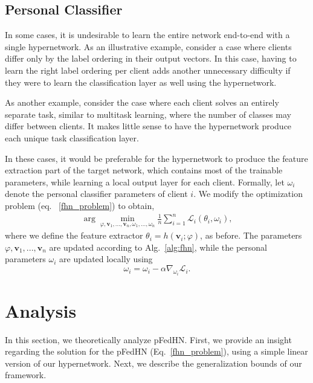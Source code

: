 \documentclass{article}
\def\eqref#1{eq. ~\ref{#1}}
\def\gL{{\mathcal{L}}}
\newcommand{\bv}{\boldsymbol{v}}
\newcommand\ourmethod{pFedHN}
\begin{document}
\subsection{Personal Classifier}

In some cases, it is undesirable to learn the entire network end-to-end with a single hypernetwork. As an illustrative example, consider a case where clients differ only by the label ordering in their output vectors. In this case, having to learn the right label ordering per client adds another unnecessary  difficulty if they were to learn the classification layer as well using the hypernetwork.



As another example, consider the case where each client solves an entirely separate task, similar to multitask learning, where the number of classes may differ between clients. It makes little sense to have the hypernetwork produce each unique task classification layer. 

In these cases, it would be preferable for the hypernetwork to produce the feature extraction part of the target network, which contains most of the trainable parameters, while learning a local output layer for each client. Formally, let $\omega_i$ denote the personal classifier parameters of client $i$. We modify the optimization problem (\eqref{fhn_problem}) to obtain,
\begin{align}\label{pfhn_problem}
    \arg\min_{\varphi,\bv_1,...,\bv_n,\omega_1,...,\omega_n} \frac{1}{n} \sum_{i=1}^n \gL_i(\theta_i,\omega_i),
\end{align}
where we define the feature extractor $\theta_i=h(\bv_i;\varphi)$, as before. The parameters $\varphi, \bv_1, ...,\bv_n$ are updated according to Alg.~\ref{alg:fhn}, while the personal parameters $\omega_i$ are updated locally using 
\begin{equation}
    \omega_i=\omega_i-\alpha\nabla_{\omega_i}\gL_i. \nonumber
\end{equation}


\section{Analysis}\label{sec:theory}

In this section, we theoretically analyze \ourmethod{}. First, we provide an insight regarding the solution for the  \ourmethod{} (Eq.~\ref{fhn_problem}), using a simple linear version of our hypernetwork. Next, we describe the generalization bounds of our framework.
\end{document}
